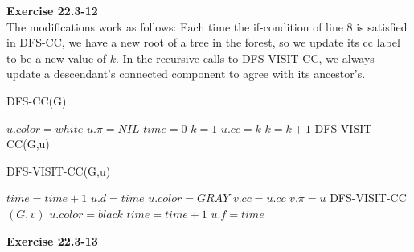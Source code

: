 \documentclass{article}
\begin{document}
\noindent\textbf{Exercise 22.3-12}\\

The modifications work as follows:  Each time the if-condition of line 8 is satisfied in DFS-CC, we have a new root of a tree in the forest, so we update its cc label to be a new value of $k$.  In the recursive calls to DFS-VISIT-CC, we always update a descendant's connected component to agree with its ancestor's. \\

\begin{algorithm}
\caption{DFS-CC(G)}
\begin{algorithmic}[1]
	\State $u.color = white$
	\State $u.\pi = NIL$
\EndFor
\State $time = 0$
\State $k = 1$
		\State $u.cc = k$
		\State $k = k + 1$
		\State DFS-VISIT-CC(G,u)
	\EndIf
\EndFor
\end{algorithmic}
\end{algorithm}


\begin{algorithm}
\caption{DFS-VISIT-CC(G,u)}
\begin{algorithmic}[1]
\State $time = time + 1$
\State $u.d = time$
\State $u.color = GRAY$
	\State $v.cc = u.cc$
		\State $v.\pi = u$
		\State DFS-VISIT-CC$(G,v)$
	\EndIf
\EndFor 
\State $u.color = black$
\State $time = time + 1$
\State $u.f = time$
\end{algorithmic}
\end{algorithm}

\noindent\textbf{Exercise 22.3-13}\\
\end{document}
